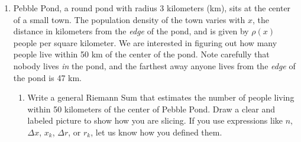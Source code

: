 \documentclass{article}
\begin{document}
\begin{enumerate}



  \item \label{2018practice2}
 
 Pebble Pond, a round pond with radius 3 kilometers (km), sits at the center of a small town. The population density of the town varies with $x$, the distance in kilometers from the \textit{edge} of the pond, and is given by $\rho(x)$ people per square kilometer. We are interested in figuring out how many people live within 50 km of the center of the pond. Note carefully that nobody lives {\it in} the pond, and the farthest away anyone lives from the \textit{edge} of the pond is 47 km. 

\begin{enumerate}
\item Write a general Riemann Sum that estimates the number of people living within 50 kilometers of the center of Pebble Pond. Draw a clear and labeled picture to show how you are slicing. If you use expressions like $n$, $\Delta x$, $x_k$, $\Delta r$, or $r_k$, let us know how you defined them. 



\end{enumerate}
\end{enumerate}
\end{document}
